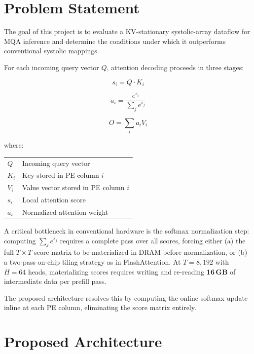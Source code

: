 \documentclass[11pt]{article}
\begin{document}
\section{Problem Statement}

The goal of this project is to evaluate a KV-stationary systolic-array
dataflow for MQA inference and determine the conditions under which
it outperforms conventional systolic mappings.

For each incoming query vector \(Q\), attention decoding proceeds
in three stages:

\vspace{-0.5em}

\[
s_i = Q \cdot K_i
\]

\[
a_i =
\frac{e^{s_i}}
{\sum_j e^{s_j}}
\]

\[
O = \sum_i a_i V_i
\]

\vspace{-0.5em}

where:

\begin{center}
\begin{tabular}{ll}
\(Q\) & Incoming query vector \\
\(K_i\) & Key stored in PE column \(i\) \\
\(V_i\) & Value vector stored in PE column \(i\) \\
\(s_i\) & Local attention score \\
\(a_i\) & Normalized attention weight \\
\end{tabular}
\end{center}

A critical bottleneck in conventional hardware is the
softmax normalization step: computing
\(\sum_j e^{s_j}\) requires a complete pass over all scores,
forcing either (a) the full \(T \times T\) score matrix to be
materialized in DRAM before normalization, or (b) a two-pass
on-chip tiling strategy as in FlashAttention.
At \(T = 8{,}192\) with \(H = 64\) heads, materializing scores
requires writing and re-reading \textbf{16\,GB} of intermediate
data per prefill pass.

The proposed architecture resolves this by computing the
online softmax update inline at each PE column, eliminating
the score matrix entirely.

\section{Proposed Architecture}
\end{document}
